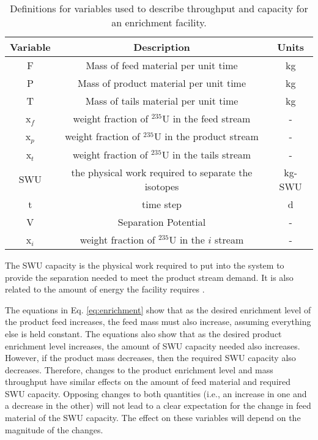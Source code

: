 \begin{table}
    \centering
    \caption{Definitions for variables used to describe throughput and 
    capacity for an enrichment facility.}
    \label{tab:enrichment_variables}
    \begin{tabular}{c c c}
        \hline
        Variable & Description & Units\\\hline
        F & Mass of feed material per unit time & kg\\
        P & Mass of product material per unit time & kg \\
        T & Mass of tails material per unit time & kg\\
        x$_f$ & weight fraction of $^{235}$U in the feed stream & -\\
        x$_p$ & weight fraction of $^{235}$U in the product stream & - \\
        x$_t$ & weight fraction of $^{235}$U in the tails stream & - \\
        \gls{SWU} & the physical work required to separate the isotopes & kg-SWU\\
        t & time step & d\\
        V & Separation Potential & - \\
        x$_i$ & weight fraction of $^{235}$U in the $i$ stream & - \\
        \hline
    \end{tabular}
\end{table}

\noindent The \acrfull{SWU} capacity 
is the physical work required to put into the system to provide the 
separation needed to meet the product stream demand. It is also related 
to the amount of energy the facility 
requires \cite{tsoulfanidis_nuclear_2013}. 

The equations in Eq. \ref{eq:enrichment} show that as the desired enrichment level 
of the product feed increases, the feed mass must also increase, assuming everything 
else is held constant. The equations also show that as the desired 
product 
enrichment level increases, the amount of \gls{SWU} capacity needed also increases. 
However, if the product mass decreases, then the required \gls{SWU} capacity 
also decreases. Therefore, changes to the product enrichment level and mass 
throughput have similar effects on the amount of feed material and required 
\gls{SWU} capacity. Opposing changes to both quantities 
(i.e., an increase in one and a decrease in the other) will not lead to a clear 
expectation for the change in feed material of the \gls{SWU} capacity. 
The effect on these variables will depend on the magnitude of the changes.

